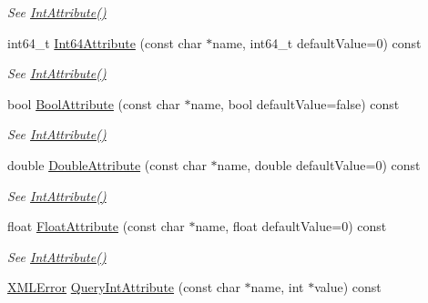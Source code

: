 \begin{DoxyCompactItemize}
\begin{DoxyCompactList}\small\item\em See \mbox{\hyperlink{classtinyxml2_1_1_x_m_l_element_a95a89b13bb14a2d4655e2b5b406c00d4}{Int\+Attribute()}} \end{DoxyCompactList}\item 
int64\+\_\+t \mbox{\hyperlink{classtinyxml2_1_1_x_m_l_element_a66d96972adecd816194191f13cc4a0a0}{Int64\+Attribute}} (const char $\ast$name, int64\+\_\+t default\+Value=0) const
\begin{DoxyCompactList}\small\item\em See \mbox{\hyperlink{classtinyxml2_1_1_x_m_l_element_a95a89b13bb14a2d4655e2b5b406c00d4}{Int\+Attribute()}} \end{DoxyCompactList}\item 
bool \mbox{\hyperlink{classtinyxml2_1_1_x_m_l_element_a53eda26131e1ad1031ef8ec8adb51bd8}{Bool\+Attribute}} (const char $\ast$name, bool default\+Value=false) const
\begin{DoxyCompactList}\small\item\em See \mbox{\hyperlink{classtinyxml2_1_1_x_m_l_element_a95a89b13bb14a2d4655e2b5b406c00d4}{Int\+Attribute()}} \end{DoxyCompactList}\item 
double \mbox{\hyperlink{classtinyxml2_1_1_x_m_l_element_a10a90c505aea716bf073eea1c97f33b5}{Double\+Attribute}} (const char $\ast$name, double default\+Value=0) const
\begin{DoxyCompactList}\small\item\em See \mbox{\hyperlink{classtinyxml2_1_1_x_m_l_element_a95a89b13bb14a2d4655e2b5b406c00d4}{Int\+Attribute()}} \end{DoxyCompactList}\item 
float \mbox{\hyperlink{classtinyxml2_1_1_x_m_l_element_ab1f4be2332e27dc640e9b6abd01d64dd}{Float\+Attribute}} (const char $\ast$name, float default\+Value=0) const
\begin{DoxyCompactList}\small\item\em See \mbox{\hyperlink{classtinyxml2_1_1_x_m_l_element_a95a89b13bb14a2d4655e2b5b406c00d4}{Int\+Attribute()}} \end{DoxyCompactList}\item 
\mbox{\hyperlink{namespacetinyxml2_a1fbf88509c3ac88c09117b1947414e08}{X\+M\+L\+Error}} \mbox{\hyperlink{classtinyxml2_1_1_x_m_l_element_a8a78bc1187c1c45ad89f2690eab567b1}{Query\+Int\+Attribute}} (const char $\ast$name, int $\ast$value) const
\item 

\end{DoxyCompactItemize}
